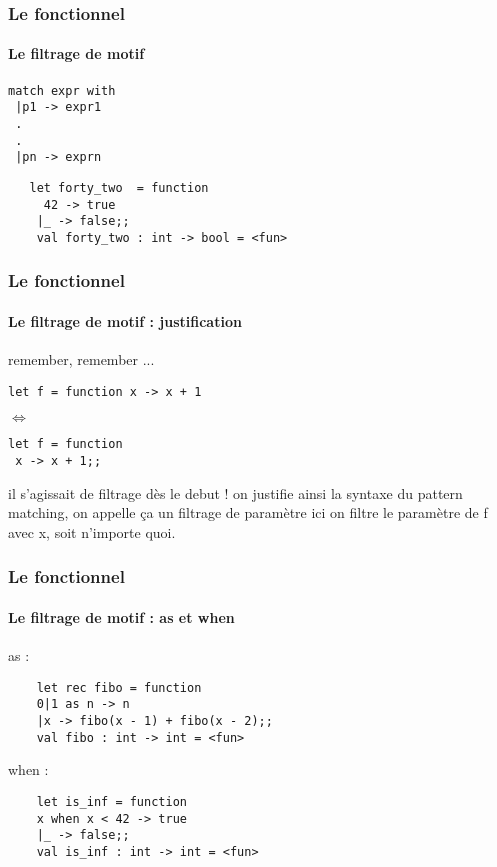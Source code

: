 \begin{frame}[fragile]
  \frametitle{Le fonctionnel}
  \framesubtitle{Le filtrage de motif}
  \begin{minipage}[t]{5cm}
    \begin{lstlisting}
match expr with
 |p1 -> expr1
 .
 .
 |pn -> exprn
 \end{lstlisting}
 \end{minipage}
 \begin{minipage}[t]{8cm}
   \begin{lstlisting}
   let forty_two  = function
     42 -> true
    |_ -> false;;
    val forty_two : int -> bool = <fun>
   \end{lstlisting} 
 \end{minipage}
\end{frame}

\begin{frame}[fragile]
  \frametitle{Le fonctionnel}
  \framesubtitle{Le filtrage de motif : justification}
remember, remember ...
\begin{lstlisting}
let f = function x -> x + 1 
\end{lstlisting}
\begin{center}
\begin{rotate}{90}
$\Leftrightarrow$
\end{rotate}
\end{center}
\begin{lstlisting}
let f = function 
 x -> x + 1;;
 \end{lstlisting}
  il s'agissait de filtrage dès le debut ! on justifie ainsi la syntaxe du pattern matching, 
  on appelle ça un filtrage de paramètre ici on filtre le paramètre de f avec x, soit n'importe quoi.
\end{frame}

\begin{frame}[fragile]
  \frametitle{Le fonctionnel}
  \framesubtitle{Le filtrage de motif : as et when}
  \begin{itemize}
  \begin{minipage}[t]{5cm}
  \item
    as :
    \begin{lstlisting}
	let rec fibo = function 
 	0|1 as n -> n 
 	|x -> fibo(x - 1) + fibo(x - 2);; 
	val fibo : int -> int = <fun>
    \end{lstlisting}
  \end{minipage}
  \begin{minipage}[t]{5cm}
  \item
    when :
    \begin{lstlisting}
	let is_inf = function 
  	x when x < 42 -> true
 	|_ -> false;;
	val is_inf : int -> int = <fun>
    \end{lstlisting}
  \end{minipage}
  \end{itemize}
\end{frame}

